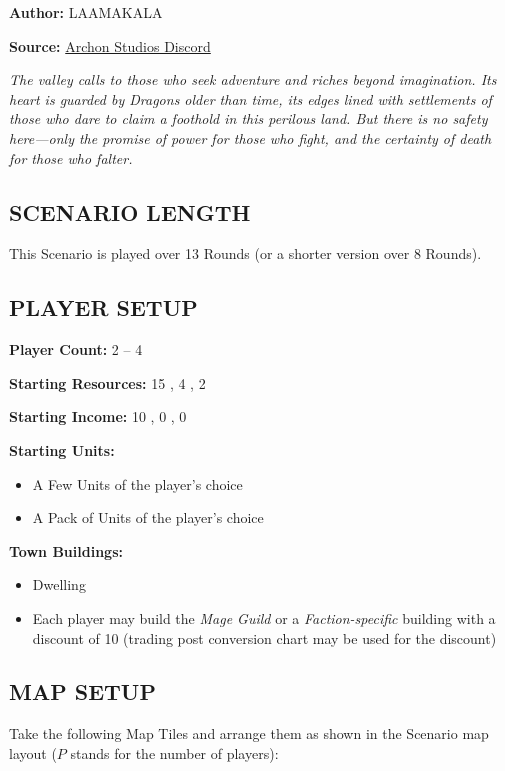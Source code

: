 
\begin{multicols*}{2}

\textbf{Author:} LAAMAKALA

\textbf{Source:} \href{https://discord.com/channels/740870068178649108/1239631918643941509}{Archon Studios Discord}

\textit{The valley calls to those who seek adventure and riches beyond imagination. Its heart is guarded by Dragons older than time, its edges lined with settlements of those who dare to claim a foothold in this perilous land. But there is no safety here—only the promise of power for those who fight, and the certainty of death for those who falter.}

\subsection*{\MakeUppercase{Scenario Length}}
This Scenario is played over 13 Rounds (or a shorter version over 8 Rounds).

\subsection*{\MakeUppercase{Player Setup}}
\textbf{Player Count:} 2 -- 4

\textbf{Starting Resources:} 15 , 4 , 2 

\textbf{Starting Income:} 10 , 0 , 0 

\textbf{Starting Units:}
\begin{itemize}
  \item A Few  Units of the player's choice
  \item A Pack of  Units of the player's choice
\end{itemize}

\textbf{Town Buildings:} 
\begin{itemize}
  \item {} Dwelling
  \item Each player may build the \textit{Mage Guild} or a \textit{Faction-specific} building with a discount of 10  (trading post conversion chart may be used for the discount)
\end{itemize}

\subsection*{\MakeUppercase{Map Setup}}
Take the following Map Tiles and arrange them as shown in the Scenario map layout ($P$ stands for the number of players):


\end{multicols*}
